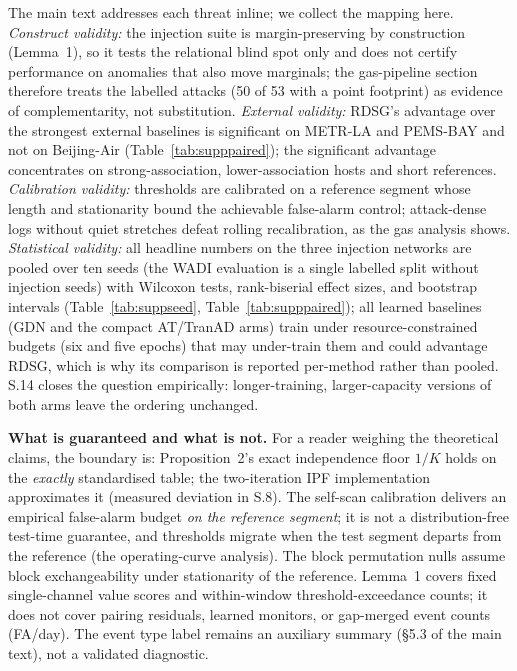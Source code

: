 \documentclass[11pt,a4paper]{article}
\begin{document}
The main text addresses each threat inline; we collect the mapping here.
\emph{Construct validity:} the injection suite is margin-preserving by
construction (Lemma~1), so it tests the relational blind spot only and
does not certify performance on anomalies that also move marginals; the
gas-pipeline section therefore treats the labelled attacks (50 of 53 with
a point footprint) as evidence of complementarity, not substitution.
\emph{External validity:} RDSG's advantage over the strongest external baselines is significant on
METR-LA and PEMS-BAY and not on Beijing-Air
(Table~\ref{tab:supppaired}); the significant advantage concentrates on
strong-association, lower-association hosts and short references.
\emph{Calibration validity:} thresholds are calibrated on a reference
segment whose length and stationarity bound the achievable false-alarm
control; attack-dense logs without quiet stretches defeat rolling
recalibration, as the gas analysis shows. \emph{Statistical validity:}
all headline numbers on the three injection networks are pooled over ten seeds (the WADI evaluation is a single labelled split without injection seeds) with Wilcoxon tests,
rank-biserial effect sizes, and bootstrap intervals
(Table~\ref{tab:suppseed}, Table~\ref{tab:supppaired}); all learned baselines (GDN and the compact AT/TranAD arms) train under
resource-constrained budgets (six and five epochs) that may under-train
them and could advantage RDSG, which is why
its comparison is reported per-method rather than pooled. S.14 closes
the question empirically: longer-training, larger-capacity versions of
both arms leave the ordering unchanged.

\medskip
\noindent\textbf{What is guaranteed and what is not.} For a reader
weighing the theoretical claims, the boundary is: Proposition~2's exact
independence floor $1/K$ holds on the \emph{exactly} standardised table;
the two-iteration IPF implementation approximates it (measured deviation
in S.8). The self-scan calibration delivers an empirical false-alarm
budget \emph{on the reference segment}; it is not a distribution-free
test-time guarantee, and thresholds migrate when the test segment
departs from the reference (the operating-curve analysis). The block
permutation nulls assume block exchangeability under stationarity of the
reference. Lemma~1 covers fixed single-channel value scores and
within-window threshold-exceedance counts; it does not cover pairing
residuals, learned monitors, or gap-merged event counts (FA/day). The
event type label remains an auxiliary summary (\S5.3 of the main text),
not a validated diagnostic.
\end{document}
